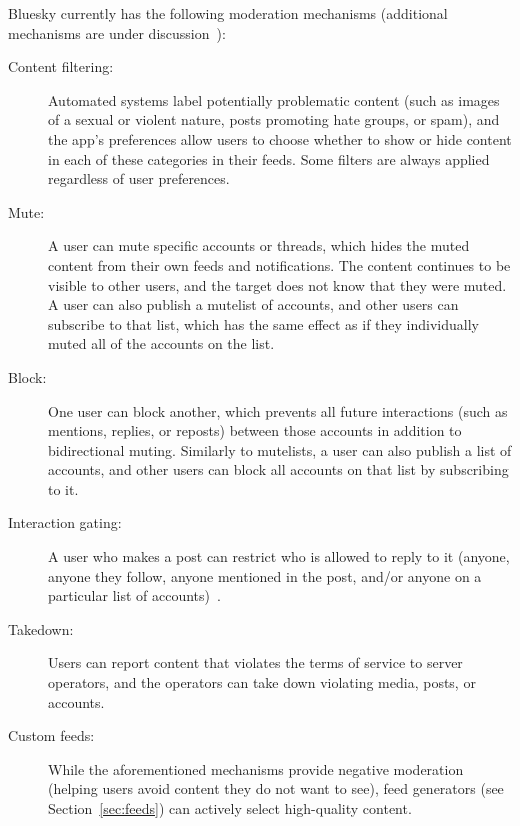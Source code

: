 \documentclass[sigconf]{acmart}
\newif\ifextendedversion
\begin{document}
Bluesky currently has the following moderation mechanisms (additional mechanisms are under discussion~\cite{Moderation}):
\begin{description}
    \item[Content filtering:] Automated systems label potentially problematic content (such as images of a sexual or violent nature, posts promoting hate groups, or spam), and the app's preferences allow users to choose whether to show or hide content in each of these categories in their feeds. Some filters are always applied regardless of user preferences.
    \item[Mute:] A user can mute specific accounts or threads, which hides the muted content from their own feeds and notifications. The content continues to be visible to other users, and the target does not know that they were muted. A user can also publish a mutelist of accounts, and other users can subscribe to that list, which has the same effect as if they individually muted all of the accounts on the list.
    \item[Block:] One user can block another, which prevents all future interactions (such as mentions, replies, or reposts) between those accounts in addition to bidirectional muting. Similarly to mutelists, a user can also publish a list of accounts, and other users can block all accounts on that list by subscribing to it.
    \item[Interaction gating:] A user who makes a post can restrict who is allowed to reply to it (anyone, anyone they follow, anyone mentioned in the post, and/or anyone on a particular list of accounts)~\cite{ReplyGating}.
    \item[Takedown:] Users can report content that violates the terms of service to server operators, and the operators can take down violating media, posts, or accounts.
    \item[Custom feeds:] While the aforementioned mechanisms provide negative moderation (helping users avoid content they do not want to see), feed generators (see Section~\ref{sec:feeds}) can actively select high-quality content.
\end{description}
\fi %

\end{document}
